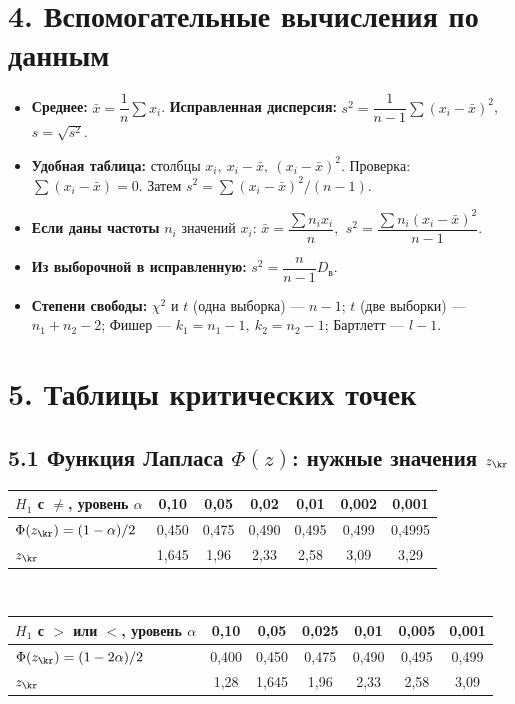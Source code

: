 \section*{4. Вспомогательные вычисления по данным}
\begin{itemize}
\item \textbf{Среднее:} $\bar x=\dfrac{1}{n}\sum x_i$. \quad \textbf{Исправленная дисперсия:} $s^2=\dfrac{1}{n-1}\sum (x_i-\bar x)^2$, \quad $s=\sqrt{s^2}$.
\item \textbf{Удобная таблица:} столбцы $x_i,\ x_i-\bar x,\ (x_i-\bar x)^2$. Проверка: $\sum(x_i-\bar x)=0$. Затем $s^2=\sum(x_i-\bar x)^2/(n-1)$.
\item \textbf{Если даны частоты} $n_i$ значений $x_i$: $\bar x=\dfrac{\sum n_ix_i}{n}$, $\ s^2=\dfrac{\sum n_i(x_i-\bar x)^2}{n-1}$.
\item \textbf{Из выборочной в исправленную:} $s^2=\dfrac{n}{n-1}D_{\text{в}}$.
\item \textbf{Степени свободы:} $\chi^2$ и $t$ (одна выборка) --- $n-1$; $t$ (две выборки) --- $n_1+n_2-2$; Фишер --- $k_1=n_1-1,\ k_2=n_2-1$; Бартлетт --- $l-1$.
\end{itemize}

\section*{5. Таблицы критических точек}
\subsection*{5.1 Функция Лапласа $\Phi(z)$: нужные значения $z_\kr$}
\renewcommand{\arraystretch}{1.2}
\noindent\begin{tabular}{@{}l|cccccc@{}}
$H_1$ с $\ne$, уровень $\alpha$ & 0,10 & 0,05 & 0,02 & 0,01 & 0,002 & 0,001 \\\hline
$\Phi(z_\kr)=(1-\alpha)/2$ & 0,450 & 0,475 & 0,490 & 0,495 & 0,499 & 0,4995 \\
$z_\kr$ & 1,645 & 1,96 & 2,33 & 2,58 & 3,09 & 3,29 \\
\end{tabular}\\[3pt]
\begin{tabular}{@{}l|cccccc@{}}
$H_1$ с $>$ или $<$, уровень $\alpha$ & 0,10 & 0,05 & 0,025 & 0,01 & 0,005 & 0,001 \\\hline
$\Phi(z_\kr)=(1-2\alpha)/2$ & 0,400 & 0,450 & 0,475 & 0,490 & 0,495 & 0,499 \\
$z_\kr$ & 1,28 & 1,645 & 1,96 & 2,33 & 2,58 & 3,09 \\
\end{tabular}

